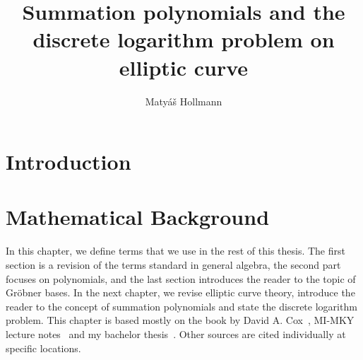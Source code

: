 \documentclass[thesis=M,english]{FITthesis}[2012/10/20]
\title{Summation polynomials and the discrete logarithm problem on elliptic curve}
\author{Matyáš Hollmann} %
\theoremstyle{remark}
\theoremstyle{definition}
\begin{document}

\chapter{Introduction}

\chapter{Mathematical Background}\label{mathBG}
%
 In this chapter, we define terms that we use in the rest of this thesis. The first section is a revision of the terms standard in general algebra, the second part focuses on polynomials, and the last section introduces the reader to the topic of Gröbner bases. In the next chapter, we revise elliptic curve theory, introduce the reader to the concept of summation polynomials and state the discrete logarithm problem. This chapter is based mostly on the book by David A. Cox~\cite{algGeom}, MI-MKY lecture notes~\cite{mky} and my bachelor thesis~\cite{myBP}. Other sources are cited individually at specific locations.
\end{document}
